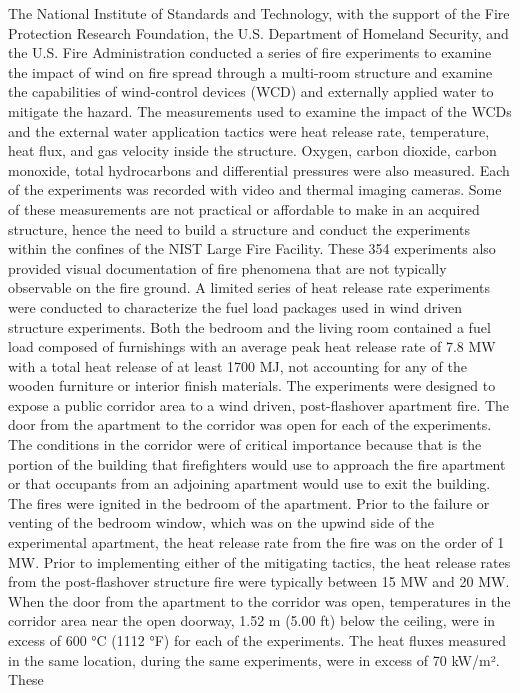 \documentclass[12pt,oneside]{book}
\begin{document}
The National Institute of Standards and Technology, with the support of the Fire Protection Research
Foundation, the U.S. Department of Homeland Security, and the U.S. Fire Administration conducted a
series of fire experiments to examine the impact of wind on fire spread through a multi-room structure
and examine the capabilities of wind-control devices (WCD) and externally applied water to mitigate the
hazard. The measurements used to examine the impact of the WCDs and the external water application
tactics were heat release rate, temperature, heat flux, and gas velocity inside the structure. Oxygen,
carbon dioxide, carbon monoxide, total hydrocarbons and differential pressures were also measured.
Each of the experiments was recorded with video and thermal imaging cameras. Some of these
measurements are not practical or affordable to make in an acquired structure, hence the need to build a
structure and conduct the experiments within the confines of the NIST Large Fire Facility. These 354
experiments also provided visual documentation of fire phenomena that are not typically observable on
the fire ground.
A limited series of heat release rate experiments were conducted to characterize the fuel load packages
used in wind driven structure experiments. Both the bedroom and the living room contained a fuel load
composed of furnishings with an average peak heat release rate of 7.8 MW with a total heat release of at
least 1700 MJ, not accounting for any of the wooden furniture or interior finish materials.
The experiments were designed to expose a public corridor area to a wind driven, post-flashover
apartment fire. The door from the apartment to the corridor was open for each of the experiments. The
conditions in the corridor were of critical importance because that is the portion of the building that
firefighters would use to approach the fire apartment or that occupants from an adjoining apartment
would use to exit the building.
The fires were ignited in the bedroom of the apartment. Prior to the failure or venting of the bedroom
window, which was on the upwind side of the experimental apartment, the heat release rate from the fire
was on the order of 1 MW. Prior to implementing either of the mitigating tactics, the heat release rates
from the post-flashover structure fire were typically between 15 MW and 20 MW. When the door from
the apartment to the corridor was open, temperatures in the corridor area near the open doorway, 1.52 m
(5.00 ft) below the ceiling, were in excess of 600 °C (1112 °F) for each of the experiments. The heat
fluxes measured in the same location, during the same experiments, were in excess of 70 kW/m². These
\end{document}
